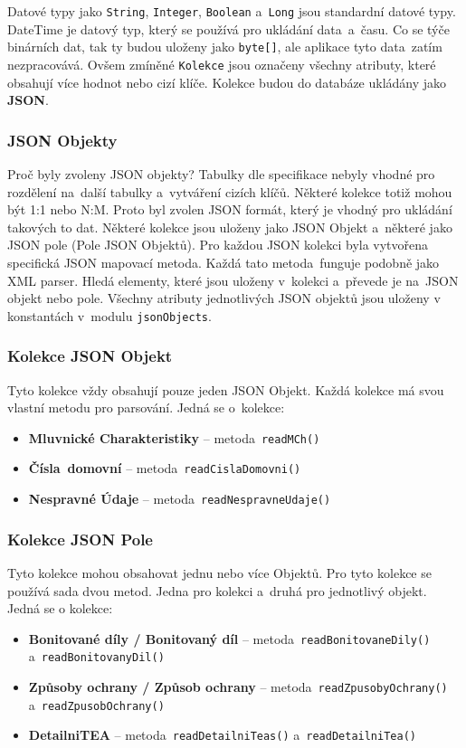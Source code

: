 Datové typy jako \texttt{String}, \texttt{Integer}, \texttt{Boolean} a~\texttt{Long} jsou standardní datové typy.
DateTime je datový typ, který se používá pro ukládání data~a~času. Co se týče binárních dat, tak ty budou uloženy jako \texttt{byte[]}, 
ale aplikace tyto data~zatím nezpracovává.
Ovšem zmíněné \texttt{Kolekce} jsou označeny všechny atributy, které obsahují více hodnot nebo cizí klíče.
Kolekce budou do databáze ukládány jako \textbf{JSON}.

\subsubsection*{JSON Objekty}
Proč byly zvoleny JSON objekty? Tabulky dle specifikace nebyly vhodné pro rozdělení na~další tabulky a~vytváření cizích klíčů.
Některé kolekce totiž mohou být 1:1 nebo N:M. Proto byl zvolen JSON formát, který je vhodný pro ukládání takových to dat.
Některé kolekce jsou uloženy jako JSON Objekt a~některé jako JSON pole (Pole JSON Objektů).
Pro každou JSON kolekci byla vytvořena specifická JSON mapovací metoda. Každá tato metoda~funguje podobně jako XML parser.
Hledá elementy, které jsou uloženy v~kolekci a~převede je na~JSON objekt nebo pole.
Všechny atributy jednotlivých JSON objektů jsou uloženy v konstantách v~modulu \texttt{jsonObjects}. 

\subsubsection*{Kolekce JSON Objekt}
Tyto kolekce vždy obsahují pouze jeden JSON Objekt.
Každá kolekce má svou vlastní metodu pro parsování.
Jedná se o~kolekce:
\begin{itemize}
    \item \textbf{Mluvnické Charakteristiky} -- metoda~\texttt{readMCh()}
    \item \textbf{Čísla~domovní} -- metoda~\texttt{readCislaDomovni()}
    \item \textbf{Nespravné Údaje} -- metoda~\texttt{readNespravneUdaje()}
\end{itemize}

\subsubsection*{Kolekce JSON Pole}
Tyto kolekce mohou obsahovat jednu nebo více Objektů.
Pro tyto kolekce se používá sada dvou metod. Jedna pro kolekci a~druhá pro jednotlivý objekt. 
Jedná se o kolekce:
\begin{itemize}
    \item \textbf{Bonitované díly / Bonitovaný díl} -- metoda~\texttt{readBonitovaneDily()} a~\texttt{readBonitovanyDil()}
    \item \textbf{Způsoby ochrany / Způsob ochrany} -- metoda~\texttt{readZpusobyOchrany()} a~\texttt{readZpusobOchrany()}
    \item \textbf{DetailniTEA} -- metoda~\texttt{readDetailniTeas()} a~\texttt{readDetailniTea()}
\end{itemize}

